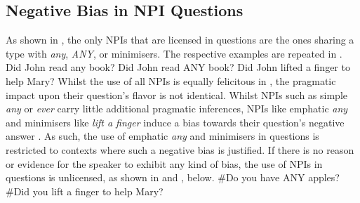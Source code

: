 \subsection{Negative Bias in NPI Questions}
As shown in , the only NPIs that are licensed in questions are the ones sharing a type with \textit{any}, \textit{ANY}, or minimisers. The respective examples are repeated in .
\pex[nopreamble=true]\label{ex:npi-question-repeat}%
\a{} Did John read any book?
\a{} Did John read \MakeUppercase{any} book?
\a{} Did John lifted a finger to help Mary?
\xe
Whilst the use of all NPIs is equally felicitous in , the pragmatic impact upon their question's flavor is not identical. Whilst NPIs such as simple \textit{any} or \textit{ever} carry little additional pragmatic inferences, NPIs like emphatic \textit{any} and minimisers like \textit{lift a finger} induce a bias towards their question's negative answer  \parencite{Borkin1971,Heim1984,Krifka1995,Abels2003,vanRooij2003,Guerzoni2003,Guerzoni2004,Asher2005,Nicolae2013,Nicolae2015,Jeong2020,Jeong2021,Jeong2022}. As such, the use of emphatic \textit{any} and minimisers in questions is restricted to contexts where such a negative bias is justified. If there is no reason or evidence for the speaker to exhibit any kind of bias, the use of NPIs in questions is unlicensed, as shown in  and , below.
\ex{}
{}
\#Do you have ANY apples?\hfill\parencite[p.~41]{Jeong2022}
\xe
\ex{}
{}
\#Did you lift a finger to help Mary?
\xe
